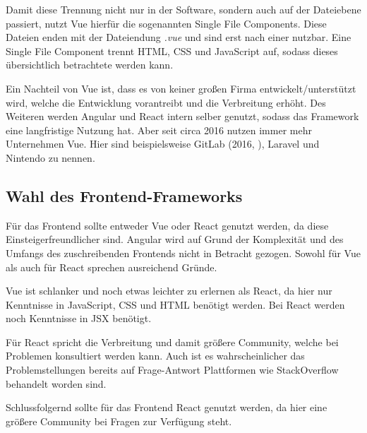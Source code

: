 Damit diese Trennung nicht nur in der Software, sondern auch auf der Dateiebene passiert, nutzt Vue hierfür die sogenannten Single File Components. Diese Dateien enden mit der Dateiendung \textit{.vue} und sind erst nach einer  nutzbar. Eine Single File Component trennt HTML, CSS und JavaScript auf, sodass dieses übersichtlich betrachtete werden kann. \cite{teufelVueJsTutorial2018a}

Ein Nachteil von Vue ist, dass es von keiner großen Firma entwickelt/unterstützt wird, welche die Entwicklung vorantreibt und die Verbreitung erhöht. Des Weiteren werden Angular und React intern selber genutzt, sodass das Framework eine langfristige Nutzung hat. Aber seit circa 2016 nutzen immer mehr Unternehmen Vue. Hier sind beispielsweise GitLab (2016, \cite{schatzWhyWeChose2016}), Laravel und Nintendo zu nennen.\cite{techuzTopWebsitesBuilt2018}

\subsection{Wahl des Frontend-Frameworks}

Für das Frontend sollte entweder Vue oder React genutzt werden, da diese Einsteigerfreundlicher sind. Angular wird auf Grund der Komplexität und des Umfangs des zuschreibenden Frontends nicht in Betracht gezogen. Sowohl für Vue als auch für React sprechen ausreichend Gründe. 

Vue ist schlanker und noch etwas leichter zu erlernen als React, da hier nur Kenntnisse in JavaScript, CSS und HTML benötigt werden. Bei React werden noch Kenntnisse in JSX benötigt.

Für React spricht die Verbreitung und damit größere Community, welche bei Problemen konsultiert werden kann. Auch ist es wahrscheinlicher das Problemstellungen bereits auf Frage-Antwort Plattformen wie StackOverflow behandelt worden sind. 

Schlussfolgernd sollte für das Frontend React genutzt werden, da hier eine größere Community bei Fragen zur Verfügung steht.


